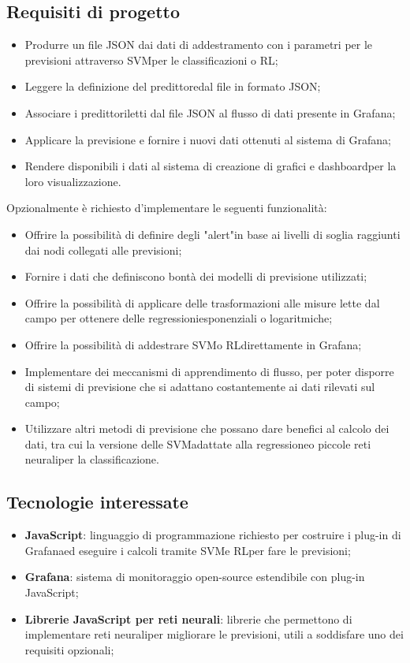 \subsection{Requisiti di progetto}
\begin{itemize}
	\item Produrre un file JSON dai dati di addestramento con i parametri per le previsioni attraverso SVM\glosp per le classificazioni o RL\glo;
	\item Leggere la definizione del predittore\glosp dal file in formato JSON;
	\item Associare i predittori\glosp letti dal file JSON al flusso di dati presente in Grafana\glo;
	\item Applicare la previsione e fornire i nuovi dati ottenuti al sistema di Grafana\glo;
	\item Rendere disponibili i dati al sistema di creazione di grafici e dashboard\glosp per la loro visualizzazione.
\end{itemize}
Opzionalmente è richiesto d'implementare le seguenti funzionalità:
\begin{itemize}
	\item Offrire la possibilità di definire degli "alert"\glosp in base ai livelli di soglia raggiunti dai nodi collegati alle previsioni;
	\item Fornire i dati che definiscono bontà dei modelli di previsione utilizzati;
	\item Offrire la possibilità di applicare delle trasformazioni alle misure lette dal campo per ottenere delle regressioni\glosp esponenziali o logaritmiche;
	\item Offrire la possibilità di addestrare SVM\glosp o RL\glosp direttamente in Grafana\glo;
	\item Implementare dei meccanismi di apprendimento di flusso, per poter disporre di sistemi di previsione che si adattano costantemente ai dati rilevati sul campo;
	\item Utilizzare altri metodi di previsione che possano dare benefici al calcolo dei dati, tra cui la versione delle SVM\glosp adattate alla regressione\glosp o piccole reti neurali\glosp per la classificazione.
\end{itemize}

\subsection{Tecnologie interessate}
\begin{itemize}
	\item \textbf{JavaScript}: linguaggio di programmazione richiesto per costruire i plug-in di Grafana\glosp ed eseguire i calcoli tramite SVM\glosp e RL\glosp per fare le previsioni;
	\item \textbf{Grafana}: sistema di monitoraggio open-source estendibile con plug-in JavaScript;
	\item \textbf{Librerie JavaScript per reti neurali}\glo: librerie che permettono di implementare reti neurali\glosp per migliorare le previsioni, utili a soddisfare uno dei requisiti opzionali;
\end{itemize}

